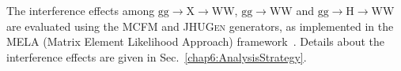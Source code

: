 The interference effects among $\mathrm{gg\to X \to WW}$, $\mathrm{gg\to WW}$ and $\mathrm{gg\to H \to WW}$ are evaluated using the  \textsc{MCFM} and \textsc{JHUGen} generators, as implemented in the MELA (Matrix Element Likelihood Approach) framework~\cite{JHUGen}. Details about the interference effects are given in Sec.~\ref{chap6:AnalysisStrategy}.
